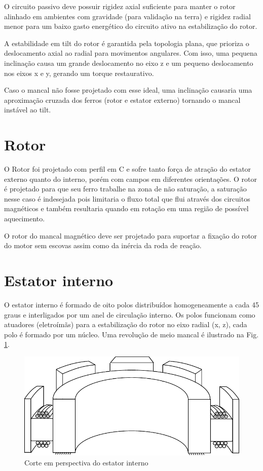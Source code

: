 O circuito passivo deve possuir rigidez axial suficiente para manter o rotor alinhado em ambientes com gravidade (para validação na terra) e rigidez radial menor para um baixo gasto energético do circuito ativo na estabilização do rotor.

A estabilidade em tilt do rotor é garantida pela topologia plana, que prioriza o deslocamento axial ao radial para movimentos angulares.
Com isso, uma pequena inclinação causa um grande deslocamento no eixo z e um pequeno deslocamento nos eixos x e y, gerando um torque restaurativo. 

Caso o mancal não fosse projetado com esse ideal, uma inclinação causaria uma aproximação cruzada dos ferros (rotor e estator externo) tornando o mancal instável ao tilt. 


\section{Rotor}

O Rotor foi projetado com perfil em C e sofre tanto força de atração do estator externo quanto do interno, porém com campos em diferentes orientações. O rotor é projetado para que seu ferro trabalhe na zona de não saturação, a saturação nesse caso é indesejada pois limitaria o fluxo total que flui através dos circuitos magnéticos e também resultaria quando em rotação em uma região de possível aquecimento.

O rotor do mancal magnético deve ser projetado para suportar a fixação do rotor do motor sem escovas assim como da inércia da roda de reação. 

\section{Estator interno}

O estator interno é formado de oito polos distribuídos homogeneamente a cada 45 graus e interligados por um anel de circulação interno. Os polos funcionam como atuadores (eletroímãs) para a estabilização do rotor no eixo radial (x, z),  cada polo é formado por um núcleo. Uma revolução de meio mancal é ilustrado na Fig. \ref{fig:modelo:mancal:estator:interno}. 

\begin{figure}[ht!]
	\centering
	\includegraphics[width=1\linewidth]{./Figs/modelo_mancal_estator_interno}
	\caption{Corte em perspectiva do estator interno}
	\label{fig:modelo:mancal:estator:interno}
\end{figure}

